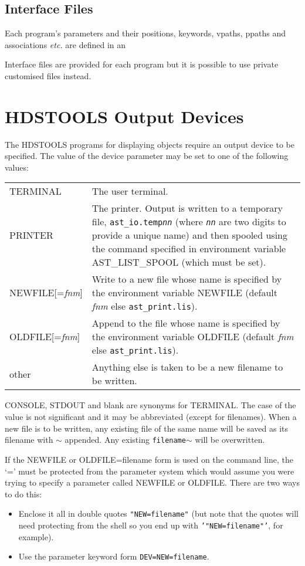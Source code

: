 \documentclass[twoside,11pt,nolof]{starlink}
\begin{document}
\subsection{Interface Files}
Each program's parameters and their positions, keywords, vpaths, ppaths and
associations \textit{etc.} are defined in an

Interface files are provided for each program but it is possible to use
private customised files instead.

\section{\label{hdstools_output_devices}HDSTOOLS Output Devices}
The HDSTOOLS programs for displaying objects require an output device to be
specified.
The value of the device parameter may be set to one of the following values:

\begin{tabular}{p{1.25in}p{4.5in}}
TERMINAL & The user terminal. \\
PRINTER  & The printer. Output is written to a temporary file,
   \texttt{ast\_io.temp\textit{nn}} (where \texttt{\textit{nn}} are two digits
   to provide a unique name) and then spooled using the command specified
   in environment variable AST\_LIST\_SPOOL (which must be set).\\
NEWFILE[=\textit{fnm}] & Write to a new file whose name is specified by the
   environment variable NEWFILE (default \textit{fnm} else
   \texttt{ast\_print.lis}). \\
OLDFILE[=\textit{fnm}] & Append to the file whose name is specified by the
   environment variable OLDFILE (default \textit{fnm} else
   \texttt{ast\_print.lis}). \\
other    & Anything else is taken to be a new filename to be written.
\end{tabular}

CONSOLE, STDOUT and blank are synonyms for TERMINAL. The case of the value is
not significant and it may be abbreviated (except for filenames).
When a new file is to be written, any existing file of the same name will
be saved as its filename with \texttt{$\sim$} appended. Any existing
\texttt{filename$\sim$} will be overwritten.

If the NEWFILE or OLDFILE=filename form is used on the command line,
the `=' must be protected from the parameter system which would
assume you were trying to specify a parameter called NEWFILE or OLDFILE.
There are two ways to do this:
\begin{itemize}
\item Enclose it all in double quotes \texttt{"NEW=filename"} (but note that
the quotes will need protecting from the shell so you end up with
\texttt{'"NEW=filename"'}, for example).
\item Use the parameter keyword form \texttt{DEV=NEW=filename}.
\end{itemize}
\end{document}
